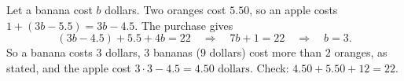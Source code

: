 Let a banana cost $b$ dollars. Two oranges cost $5.50$, so an apple costs $1+(3b-5.5)=3b-4.5$. The purchase gives
\[
(3b-4.5)+5.5+4b=22\quad\Longrightarrow\quad7b+1=22\quad\Longrightarrow\quad b=3 .
\]
So a banana costs $3$ dollars, $3$ bananas ($9$ dollars) cost more than $2$ oranges, as stated, and the apple cost $3\cdot3-4.5=\boxed{4.50\text{ dollars}}$. Check: $4.50+5.50+12=22$.

